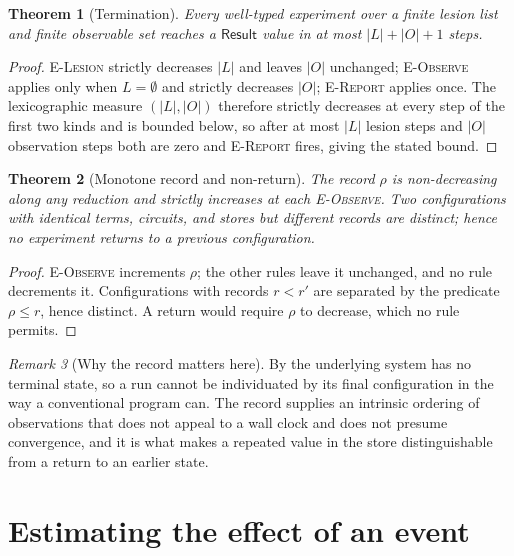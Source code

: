\documentclass[11pt,twocolumn,a4paper]{article}
\theoremstyle{thmstyle}
\newtheorem{theorem}{Theorem}[section]
\theoremstyle{definition}
\theoremstyle{remark}
\newtheorem{remark}[theorem]{Remark}
\newcommand{\abs}[1]{\lvert#1\rvert}
\newcommand{\Res}{\textsf{Result}}
\begin{document}
\begin{theorem}[Termination]
\label{thm:termination}
Every well-typed experiment over a finite lesion list and finite observable
set reaches a $\Res$ value in at most $\abs{L}+\abs{O}+1$ steps.
\end{theorem}

\begin{proof}
\textsc{E-Lesion} strictly decreases $\abs{L}$ and leaves $\abs{O}$ unchanged;
\textsc{E-Observe} applies only when $L=\emptyset$ and strictly decreases
$\abs{O}$; \textsc{E-Report} applies once. The lexicographic measure
$(\abs{L},\abs{O})$ therefore strictly decreases at every step of the first
two kinds and is bounded below, so after at most $\abs{L}$ lesion steps and
$\abs{O}$ observation steps both are zero and \textsc{E-Report} fires, giving
the stated bound.
\end{proof}

\begin{theorem}[Monotone record and non-return]
\label{thm:monotone}
The record $\rho$ is non-decreasing along any reduction and strictly increases
at each \textsc{E-Observe}. Two configurations with identical terms, circuits,
and stores but different records are distinct; hence no experiment returns to
a previous configuration.
\end{theorem}

\begin{proof}
\textsc{E-Observe} increments $\rho$; the other rules leave it unchanged, and
no rule decrements it. Configurations with records $r<r'$ are separated by the
predicate $\rho\le r$, hence distinct. A return would require $\rho$ to
decrease, which no rule permits.
\end{proof}

\begin{remark}[Why the record matters here]
\label{rem:record}
By  the underlying system has no terminal state, so a run
cannot be individuated by its final configuration in the way a conventional
program can. The record supplies an intrinsic ordering of observations that
does not appeal to a wall clock and does not presume convergence, and it is
what makes a repeated value in the store distinguishable from a return to an
earlier state.
\end{remark}

\section{Estimating the effect of an event}
\label{sec:estimation}
\end{document}

